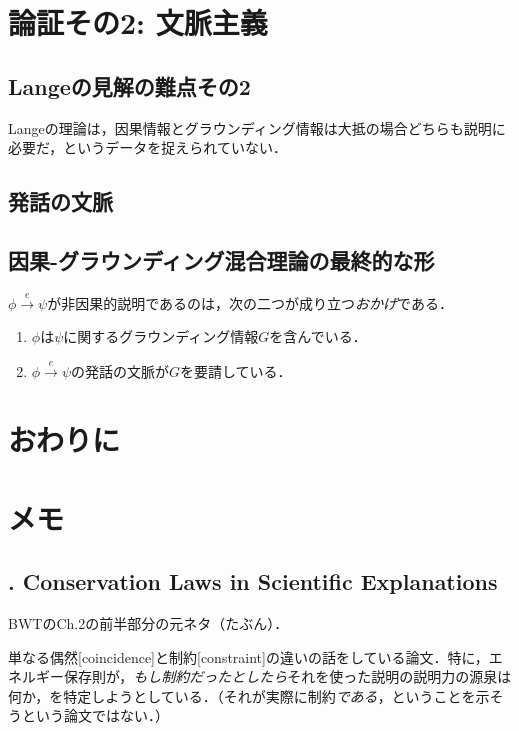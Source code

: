 \documentclass[twoside,14Q,dvipdfmx,uplatex]{jsarticle}
\theoremstyle{definition}
\begin{document}
\section{論証その2: 文脈主義}\label{secondargument}

\subsection{Langeの見解の難点その2}
Langeの理論は，因果情報とグラウンディング情報は大抵の場合どちらも説明に必要だ，というデータを捉えられていない．

\subsection{発話の文脈}

\subsection{因果-グラウンディング混合理論の最終的な形}
$\phi\xrightarrow{e}\psi$が非因果的説明であるのは，次の二つが成り立つ\emph{おかげ}である．
	\begin{enumerate}
	\item $\phi$は$\psi$に関するグラウンディング情報$G$を含んでいる．	
	\item $\phi\xrightarrow{e}\psi$の発話の文脈が$G$を要請している．
	\end{enumerate}

\section{おわりに}

\section{メモ}
\cite{Lange2009a,Lange2009b,Lange2010,Lange2011,Lange2012,Lange2013a,Lange2013b,Lange2013c,Lange2014,Lange2015,Lange2016,Lange2018a,Lange2018b}

\subsection{\cite{Lange2011}. Conservation Laws in Scientific Explanations}
BWTのCh.2の前半部分の元ネタ（たぶん）．

単なる偶然[coincidence]と制約[constraint]の違いの話をしている論文．特に，エネルギー保存則が，\emph{もし制約だったとしたら}それを使った説明の説明力の源泉は何か，を特定しようとしている．（それが実際に制約\emph{である}，ということを示そうという論文ではない．）
\end{document}
